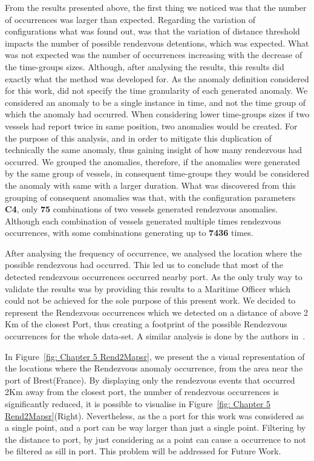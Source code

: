 From the results presented above, the first thing we noticed was that the number of occurrences was larger than expected. Regarding the variation of configurations what was found out, was that the variation of distance threshold impacts the number of possible rendezvous detentions, which was expected.
What was not expected was the number of occurrences increasing with the decrease of the time-groups sizes. 
Although, after analysing the results, this results did exactly what the method was developed for.  As the anomaly definition considered for this work, did not specify the time granularity of each generated anomaly. We considered an anomaly to be a single instance in time, and not the time group of which the anomaly had occurred. When considering lower time-groups sizes if two vessels had report twice in same position, two anomalies would be created. For the purpose of this analysis, and in order to mitigate this duplication of technically the same anomaly, thus gaining insight of how many rendezvous had occurred. We grouped the anomalies, therefore, if the anomalies were generated by the same group of vessels, in consequent time-groups they would be considered the anomaly with same with a larger duration. 
What was discovered from this grouping of consequent anomalies was that, with the configuration parameters \textbf{C4}, only \textbf{75} combinations of two vessels generated rendezvous anomalies. Although each combination of vessels generated multiple times rendezvous occurrences, with some combinations generating up to \textbf{7436} times.

After analysing the frequency of occurrence, we analysed the location where the possible rendezvous had occurred. This led us to conclude that most of the detected rendezvous occurrences occurred nearby port.
As the only truly way to validate the results was by providing this results to a Maritime Officer which could not be achieved for the sole purpose of this present work. We decided to represent the Rendezvous occurrences which we detected on a distance of above 2 Km of the closest Port, thus creating a footprint of the possible Rendezvous occurrences for the whole data-set. A similar analysis is done by the authors in~\cite{Miller2018IdentifyingBehavior}. 

In Figure~\ref{fig: Chapter 5 Rend2Mapsr}, we present the a visual representation of the locations where the Rendezvous anomaly occurrence, from the area near the port of Brest(France). By displaying only the rendezvous events that occurred 2Km away from the closest port, the number of rendezvous occurrences is significantly reduced, it is possible to visualise in Figure~\ref{fig: Chapter 5 Rend2Mapsr}(Right). Nevertheless, as the a port for this work was considered as a single point, and a port can be way larger than just a single point. Filtering by the distance to port, by just considering as a point can cause a occurrence to not be filtered as sill in port. This problem will be addressed for Future Work.


